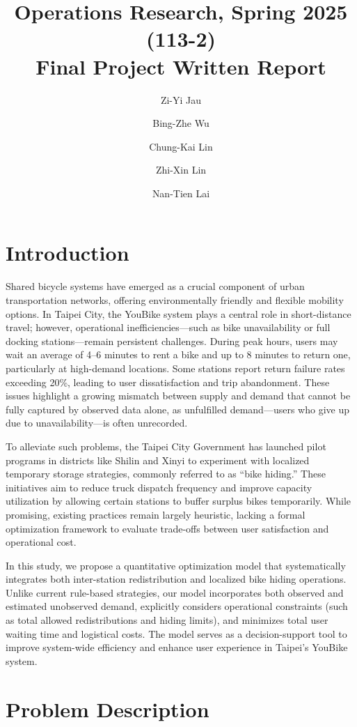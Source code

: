 \documentclass[11pt,a4paper]{article}
\title{Operations Research, Spring 2025 (113-2) \\ Final Project Written Report}
\author{Zi-Yi Jau} %
\author{Bing-Zhe Wu} %
\author{Chung-Kai Lin} %
\author{Zhi-Xin Lin} %
\author{Nan-Tien Lai} %
\affil{Department of Information Management, National Taiwan University}
\begin{document}
\maketitle

\section{Introduction}

Shared bicycle systems have emerged as a crucial component of urban transportation networks, offering environmentally friendly and flexible mobility options. In Taipei City, the YouBike system plays a central role in short-distance travel; however, operational inefficiencies—such as bike unavailability or full docking stations—remain persistent challenges. During peak hours, users may wait an average of 4–6 minutes to rent a bike and up to 8 minutes to return one, particularly at high-demand locations. Some stations report return failure rates exceeding 20\%, leading to user dissatisfaction and trip abandonment. These issues highlight a growing mismatch between supply and demand that cannot be fully captured by observed data alone, as unfulfilled demand—users who give up due to unavailability—is often unrecorded.

To alleviate such problems, the Taipei City Government has launched pilot programs in districts like Shilin and Xinyi to experiment with localized temporary storage strategies, commonly referred to as “bike hiding.” These initiatives aim to reduce truck dispatch frequency and improve capacity utilization by allowing certain stations to buffer surplus bikes temporarily. While promising, existing practices remain largely heuristic, lacking a formal optimization framework to evaluate trade-offs between user satisfaction and operational cost.

In this study, we propose a quantitative optimization model that systematically integrates both inter-station redistribution and localized bike hiding operations. Unlike current rule-based strategies, our model incorporates both observed and estimated unobserved demand, explicitly considers operational constraints (such as total allowed redistributions and hiding limits), and minimizes total user waiting time and logistical costs. The model serves as a decision-support tool to improve system-wide efficiency and enhance user experience in Taipei’s YouBike system.

\section{Problem Description}
\end{document}
